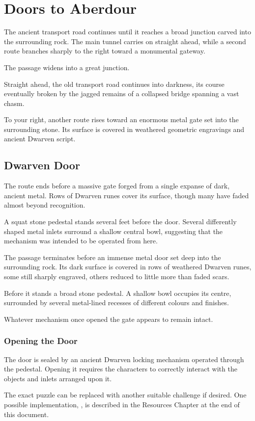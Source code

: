 \section*{ Doors to Aberdour}
{\entryfont The ancient transport road continues until it reaches a broad junction carved into the surrounding rock. The main tunnel carries on straight ahead, while a second route branches sharply to the right toward a monumental gateway.}
\begin{DndReadAloud}
	The passage widens into a great junction.

	Straight ahead, the old transport road continues into darkness, its course eventually broken by the jagged remains of a collapsed bridge spanning a vast chasm.

	To your right, another route rises toward an enormous metal gate set into the surrounding stone. Its surface is covered in weathered geometric engravings and ancient Dwarven script.
\end{DndReadAloud}
\subsection*{ Dwarven Door}
{\entryfont The route ends before a massive gate forged from a single expanse of dark, ancient metal. Rows of Dwarven runes cover its surface, though many have faded almost beyond recognition.

A squat stone pedestal stands several feet before the door. Several differently shaped metal inlets surround a shallow central bowl, suggesting that the mechanism was intended to be operated from here.}
\begin{DndReadAloud}
	The passage terminates before an immense metal door set deep into the surrounding rock. Its dark surface is covered in rows of weathered Dwarven runes, some still sharply engraved, others reduced to little more than faded scars.

	Before it stands a broad stone pedestal. A shallow bowl occupies its centre, surrounded by several metal-lined recesses of different colours and finishes.

	Whatever mechanism once opened the gate appears to remain intact.	
\end{DndReadAloud}
\subsubsection*{Opening the Door}
{\entryfont The door is sealed by an ancient Dwarven locking mechanism operated through the pedestal. Opening it requires the characters to correctly interact with the objects and inlets arranged upon it.

The exact puzzle can be replaced with another suitable challenge if desired. One possible implementation, \hyperref[ex:DwarfPuzzle]{}, is described in the Resources Chapter at the end of this document.}

